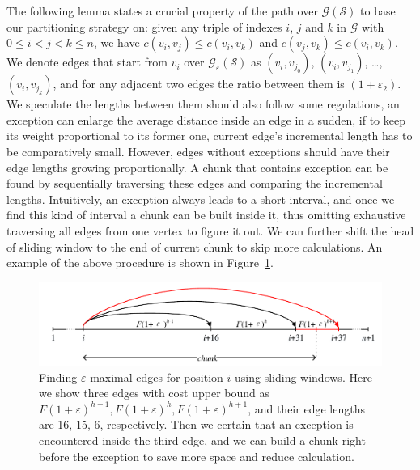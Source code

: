 \documentclass[runningheads,a4paper]{llncs}
\begin{document}
The following lemma states a crucial property of the path over $\mathcal{G}\left(\mathcal{S}\right)$ to base our partitioning strategy on:	given any triple of indexes $i$, $j$ and $k$ in $\mathcal{G}$ with $0\leqslant i<j<k\leqslant n$, we have $c(v_{i}, v_{j})\leqslant c(v_{i}, v_{k})$ and $c(v_{j}, v_{k})\leqslant c(v_{i}, v_{k})$.
We denote edges that start from $v_{i}$ over $\mathcal{G}_{\varepsilon}\left(\mathcal{S}\right)$ as $(v_{i}, v_{j_{0}})$, $(v_{i}, v_{j_{1}})$, \ldots, $(v_{i}, v_{j_{k}})$, and for any adjacent two edges the ratio between them is $(1+\varepsilon_{2})$.
We speculate the lengths between them should also follow some regulations, an exception can enlarge the average distance inside an edge in a sudden, if to keep its weight proportional to its former one, current edge's incremental length has to be comparatively small.
However, edges without exceptions should have their edge lengths growing proportionally.
A chunk that contains exception can be found by sequentially traversing these edges and comparing the incremental lengths.
Intuitively, an exception always leads to a short interval, and once we find this kind of interval a chunk can be built inside it, thus omitting exhaustive traversing all edges from one vertex to figure it out.
We can further shift the head of sliding window to the end of current chunk to skip more calculations.
An example of the above procedure is shown in Figure~\ref{fig:exceptions}.

\begin{figure}
	\centering
	\includegraphics[width=1.0\linewidth]{exception}
	\caption{Finding $\varepsilon$-maximal edges for position $ i $ using sliding windows. Here we show three edges with cost upper bound as $ F(1+\varepsilon)^{h-1}, F(1+\varepsilon)^{h}, F(1+\varepsilon)^{h+1} $, and their edge lengths are 16, 15, 6, respectively. Then we certain that an exception is encountered inside the third edge, and we can build a chunk right before the exception to save more space and reduce calculation.}
	\label{fig:exceptions}
\end{figure}
\end{document}
